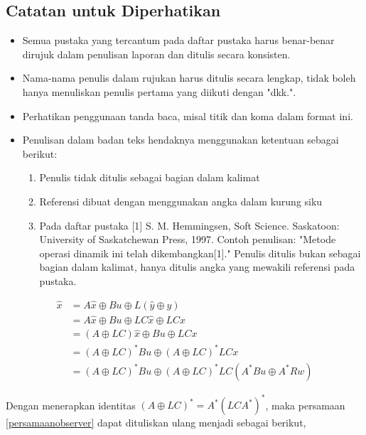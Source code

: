 \subsection{Catatan untuk Diperhatikan}
\begin{itemize}
	\item 
	Semua pustaka yang tercantum pada daftar pustaka harus benar-benar dirujuk dalam penulisan laporan dan ditulis secara konsisten.
	\item
	Nama-nama penulis dalam rujukan harus ditulis secara lengkap, tidak boleh hanya menuliskan penulis pertama yang diikuti dengan "dkk.". 
	\item
	Perhatikan penggunaan tanda baca, misal titik dan koma dalam format ini. 
	\item
	Penulisan dalam badan teks hendaknya menggunakan ketentuan sebagai berikut: 
	\begin{enumerate}
		\item
		Penulis tidak ditulis sebagai bagian dalam kalimat
		\item
		Referensi dibuat dengan menggunakan angka dalam kurung siku
		\item
		Pada daftar pustaka [1] S. M. Hemmingsen, Soft Science. Saskatoon: University of Saskatchewan Press, 1997. Contoh penulisan: "Metode operasi dinamik ini telah dikembangkan[1]." Penulis ditulis bukan sebagai bagian dalam kalimat, hanya ditulis angka yang mewakili referensi pada pustaka.
	\end{enumerate}
\end{itemize}





\begin{equation}
\begin{aligned}	
	\hat{x} &= A \hat{x} \oplus Bu\oplus L(\hat{y}\oplus y) \\
	&= A\hat{x}\oplus Bu \oplus LC\hat{x}\oplus LCx \\
	&=(A\oplus LC)\hat{x} \oplus Bu \oplus LCx \\
	&=(A\oplus LC)^* Bu \oplus (A\oplus LC)^* LCx \\
	&=(A\oplus LC)^* Bu \oplus (A\oplus LC)^* LC(A^*Bu\oplus A^*Rw)
\end{aligned} \label{persamaanobserver}
\end{equation}

Dengan menerapkan identitas $ (A\oplus LC)^* = A^* (LCA^*)^* $, maka persamaan \ref{persamaanobserver} dapat dituliskan ulang menjadi sebagai berikut,

